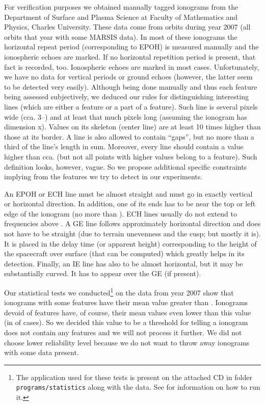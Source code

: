 For verification purposes we obtained  manually tagged ionograms from the Department of Surface and Plasma Science at Faculty of Mathematics and Physics, Charles University. These data come from  orbits during year 2007 (all orbits that year with some MARSIS data). In most of these ionograms the horizontal repeat period (corresponding to EPOH) is measured manually and the ionospheric echoes are marked. If no horizontal repetition period is present, that fact is recorded, too. Ionospheric echoes are marked in most cases. Unfortunately, we have no data for vertical periods or ground echoes (however, the latter seem to be detected very easily). Although being done manually and thus each feature being assessed subjectively, we deduced our rules for distinguishing interesting lines (which are either a feature or a part of a feature). Such line is several pixels wide (cca. 3--) and at least that much pixels long (assuming the ionogram has dimension x). Values on its skeleton (center line) are at least 10 times higher than those at its border. A line is also allowed to contain ``gaps'', but no more than a third of the line's length in sum. Moreover, every line should contain a value higher than cca.  (but not all points with higher values belong to a feature). Such definition looks, however, vague. So we propose additional specific constraints implying from the features we try to detect in our experiments. 

An EPOH or ECH line must be almost straight and must go in exactly vertical or horizontal direction. In addition, one of its ends has to be near the top or left edge of the ionogram (no more than ). ECH lines usually do not extend to frequencies above . A GE line follows approximately horizontal direction and does not have to be straight (due to terrain unevenness and the cusp; but mostly it is). It is placed in the delay time (or apparent height) corresponding to the height of the spacecraft over surface (that can be computed) which greatly helps in its detection. Finally, an IE line has also to be almost horizontal, but it may be substantially curved. It has to appear over the GE (if present).

Our statistical tests we conducted\footnote{The application used for these tests is present on the attached CD in folder \texttt{programs/statistics} along with the data. See  for information on how to run it.} on the data from year 2007 show that  ionograms with some features have their mean value greater than . Ionograms devoid of features have, of course, their mean values even lower than this value (in  of cases). So we decided this value to be a threshold for telling a ionogram does not contain any features and we will not process it further. We did not choose lower reliability level because we do not want to throw away ionograms with some data present.

